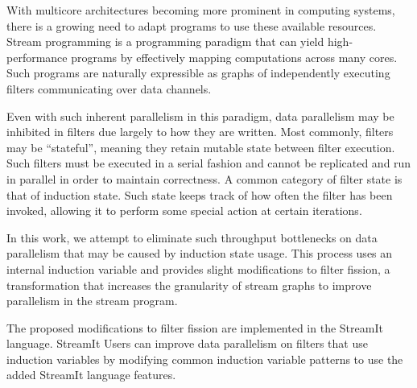 With multicore architectures becoming more prominent in computing
systems, there is a growing need to adapt programs to use these
available resources.  Stream programming is a programming 
paradigm that can yield high-performance programs by effectively
mapping computations across many cores.  Such programs are naturally
expressible as graphs of independently executing filters communicating 
over data channels.  

Even with such inherent parallelism in this paradigm, data parallelism
may be inhibited in filters due largely to how they are written.  
Most commonly, filters may be "`stateful"', meaning they retain mutable 
state between filter execution.  Such filters must be executed in a 
serial fashion and cannot be replicated and run in parallel in order
to maintain correctness.  A common category of filter state is that of 
induction state.  Such state keeps track of how often the filter has 
been invoked, allowing it to perform some special action at certain 
iterations.  

In this work, we attempt to eliminate such throughput bottlenecks on 
data parallelism that may be caused by induction state usage.  This 
process uses an internal induction variable and provides slight 
modifications to filter fission, a transformation that increases the 
granularity of stream graphs to improve parallelism in the stream program.

The proposed modifications to filter fission are implemented in the 
StreamIt language.  StreamIt Users can improve data parallelism on 
filters that use induction variables by modifying common induction 
variable patterns to use the added StreamIt language features. 
